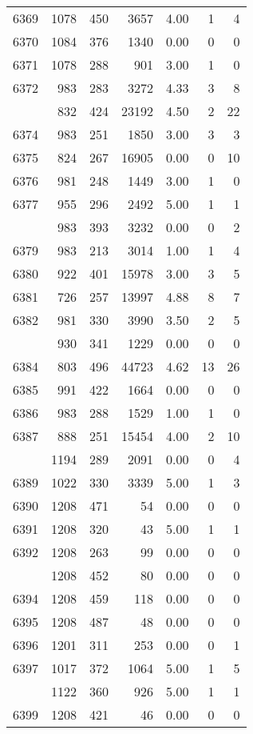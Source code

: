 \documentclass[
]{article}
\begin{document}
\begin{table}
\begin{tabular}[t]{lrrrrrr}
6369 & 1078 & 450 & 3657 & 4.00 & 1 & 4\\
6370 & 1084 & 376 & 1340 & 0.00 & 0 & 0\\
6371 & 1078 & 288 & 901 & 3.00 & 1 & 0\\
6372 & 983 & 283 & 3272 & 4.33 & 3 & 8\\
\addlinespace
6373 & 832 & 424 & 23192 & 4.50 & 2 & 22\\
6374 & 983 & 251 & 1850 & 3.00 & 3 & 3\\
6375 & 824 & 267 & 16905 & 0.00 & 0 & 10\\
6376 & 981 & 248 & 1449 & 3.00 & 1 & 0\\
6377 & 955 & 296 & 2492 & 5.00 & 1 & 1\\
\addlinespace
6378 & 983 & 393 & 3232 & 0.00 & 0 & 2\\
6379 & 983 & 213 & 3014 & 1.00 & 1 & 4\\
6380 & 922 & 401 & 15978 & 3.00 & 3 & 5\\
6381 & 726 & 257 & 13997 & 4.88 & 8 & 7\\
6382 & 981 & 330 & 3990 & 3.50 & 2 & 5\\
\addlinespace
6383 & 930 & 341 & 1229 & 0.00 & 0 & 0\\
6384 & 803 & 496 & 44723 & 4.62 & 13 & 26\\
6385 & 991 & 422 & 1664 & 0.00 & 0 & 0\\
6386 & 983 & 288 & 1529 & 1.00 & 1 & 0\\
6387 & 888 & 251 & 15454 & 4.00 & 2 & 10\\
\addlinespace
6388 & 1194 & 289 & 2091 & 0.00 & 0 & 4\\
6389 & 1022 & 330 & 3339 & 5.00 & 1 & 3\\
6390 & 1208 & 471 & 54 & 0.00 & 0 & 0\\
6391 & 1208 & 320 & 43 & 5.00 & 1 & 1\\
6392 & 1208 & 263 & 99 & 0.00 & 0 & 0\\
\addlinespace
6393 & 1208 & 452 & 80 & 0.00 & 0 & 0\\
6394 & 1208 & 459 & 118 & 0.00 & 0 & 0\\
6395 & 1208 & 487 & 48 & 0.00 & 0 & 0\\
6396 & 1201 & 311 & 253 & 0.00 & 0 & 1\\
6397 & 1017 & 372 & 1064 & 5.00 & 1 & 5\\
\addlinespace
6398 & 1122 & 360 & 926 & 5.00 & 1 & 1\\
6399 & 1208 & 421 & 46 & 0.00 & 0 & 0\\

\end{tabular}
\end{table}
\end{document}
